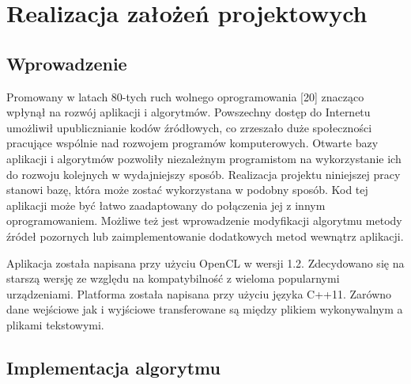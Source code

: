 \chapter{Realizacja założeń projektowych}\label{cha:rzp}


\section{Wprowadzenie}\label{sec:wprowadzenie}


Promowany w latach 80-tych ruch wolnego oprogramowania [20] znacząco wpłynął na rozwój aplikacji i algorytmów. Powszechny dostęp do Internetu umożliwił upublicznianie kodów źródłowych, co zrzeszało duże społeczności pracujące wspólnie nad rozwojem programów komputerowych. Otwarte bazy aplikacji i algorytmów pozwoliły niezależnym programistom  na wykorzystanie ich do rozwoju kolejnych w wydajniejszy sposób. Realizacja projektu niniejszej pracy stanowi bazę, która może zostać wykorzystana w podobny sposób. Kod tej aplikacji może być łatwo zaadaptowany do połączenia jej z innym oprogramowaniem. Możliwe też jest wprowadzenie modyfikacji algorytmu metody źródeł pozornych  lub zaimplementowanie dodatkowych metod wewnątrz aplikacji.


Aplikacja została napisana przy użyciu OpenCL w wersji 1.2. Zdecydowano się na starszą wersję ze względu na kompatybilność z wieloma popularnymi urządzeniami. Platforma została napisana przy użyciu języka C++11. Zarówno dane wejściowe jak i wyjściowe transferowane są między plikiem wykonywalnym a plikami tekstowymi.    




\section{Implementacja algorytmu}\label{sec:ra}

